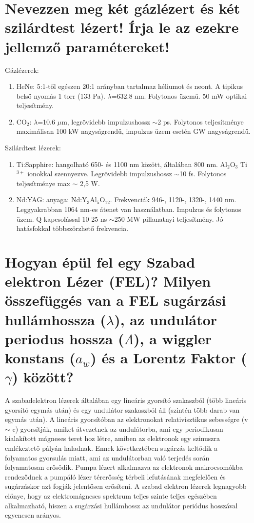 \documentclass[12pt, a4paper]{article}
\begin{document}
\section{Nevezzen meg két gázlézert és két szilárdtest lézert! Írja le az ezekre jellemző paramétereket!}
Gázlézerek:
\begin{enumerate}
\item HeNe: 5:1-től egészen 20:1 arányban tartalmaz héliumot és neont. A tipikus belső nyomás 1 torr (133 Pa). $\lambda$=632.8 nm. Folytonos üzemű. 50 mW optikai teljesítmény.
\item CO$_2$: $\lambda$=10.6 $\mu$m, legrövidebb impulzushossz $\sim$2 ps. Folytonos teljesítménye maximálisan 100 kW nagyságrendű, impulzus üzem esetén GW nagyságrendű.
\end{enumerate}	
Szilárdtest lézerek:	
\begin{enumerate}
\item Ti:Sapphire: hangolható 650- és 1100 nm között, általában 800 nm. Al$_2$O$_3$ Ti$^{3+}$ ionokkal szennyezve. Legrövidebb impulzushossz $\sim$10 fs. Folytonos teljesítménye max $\sim$ 2,5 W.
\item Nd:YAG: anyaga: Nd:Y$_3$Al$_5$O$_{12}$. Frekvenciák 946-, 1120-, 1320-, 1440 nm. Leggyakrabban 1064 nm-es átenet van használatban. Impulzus és folytonos üzem. Q-kapcsolással 10-25 ns $\sim$250 MW pillanatnyi teljesítmény. Jó hatásfokkal többszörzhető frekvencia.
\end{enumerate}

\section{Hogyan épül fel egy Szabad elektron Lézer (FEL)? Milyen összefüggés van a FEL sugárzási hullámhossza ($\lambda$), az undulátor periodus hossza ($\Lambda$), a wiggler konstans ($a_w$) és a Lorentz Faktor ($\gamma$) között?}
A szabadelektron lézerek általában egy lineáris gyorsító szakaszból (több lineáris gyorsító egymás után) és egy undulátor szakaszból áll (szintén több darab van egymás után). A lineáris gyorsítóban az elektronokat relativisztikus sebességre (v $\sim$ c) gyorsítják, amiket átvezetnek az undulátorba, ami egy periodikusan kialakított mágneses teret hoz létre, amiben az elektronok egy szinuszra emlékeztető pályán haladnak. Ennek következtében sugárzás keltődik a folyamatos gyorsulás miatt, ami az undulátorban való terjedés során folyamatosan erősödik. Pumpa lézert alkalmazva az elektronok makrocsomókba rendeződnek a pumpáló lézer térerősség térbeli lefutásának megfelelően és sugárzáskor azt fogják jelentősen erősíteni. A szabad elektron lézerek legnagyobb előnye, hogy az elektromágneses spektrum teljes szinte teljes egészében alkalmazható, hiszen a sugárzási hullámhossz az undulátor periódus hosszával egyenesen arányos.
\end{document}
